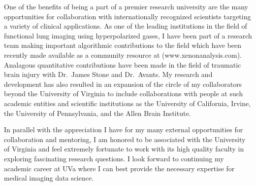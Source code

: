 \documentclass[
  11pt,
]{article}
\begin{document}
One of the benefits of being a part of a premier research university are
the many opportunities for collaboration with internationally recognized
scientists targeting a variety of clinical applications. As one of the
leading institutions in the field of functional lung imaging using
hyperpolarized gases, I have been part of a research team making
important algorithmic contributions to the field which have been
recently made available as a community resource at
(www.xenonanalysis.com). Analagous quantitative contributions have been
made in the field of traumatic brain injury with Dr.~James Stone and
Dr.~Avants. My research and development has also resulted in an
expansion of the circle of my collaborators beyond the University of
Virginia to include collaborations with people at such academic entities
and scientific institutions as the University of California, Irvine, the
University of Pennsylvania, and the Allen Brain Institute.

In parallel with the appreciation I have for my many external
opportunities for collaboration and mentoring, I am honored to be
associated with the University of Virginia and feel extremely fortunate
to work with its high quality faculty in exploring fascinating research
questions. I look forward to continuing my academic career at UVa where
I can best provide the necessary expertise for medical imaging data
science.
\end{document}
